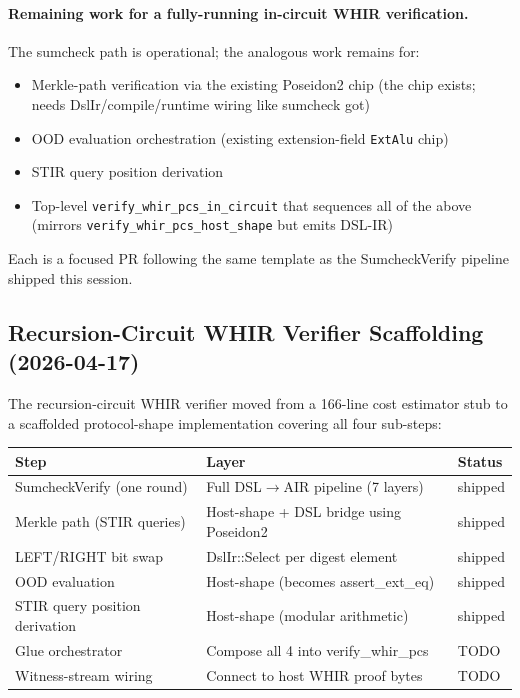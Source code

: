 \paragraph{Remaining work for a fully-running in-circuit WHIR
verification.}  The sumcheck path is operational; the analogous
work remains for:
\begin{itemize}
  \item Merkle-path verification via the existing Poseidon2 chip
        (the chip exists; needs DslIr/compile/runtime wiring like
        sumcheck got)
  \item OOD evaluation orchestration (existing extension-field
        \texttt{ExtAlu} chip)
  \item STIR query position derivation
  \item Top-level \texttt{verify\_whir\_pcs\_in\_circuit} that
        sequences all of the above (mirrors
        \texttt{verify\_whir\_pcs\_host\_shape} but emits DSL-IR)
\end{itemize}
Each is a focused PR following the same template as the
SumcheckVerify pipeline shipped this session.

\subsection{Recursion-Circuit WHIR Verifier Scaffolding (2026-04-17)}

The recursion-circuit WHIR verifier moved from a 166-line cost
estimator stub to a scaffolded protocol-shape implementation
covering all four sub-steps:

\begin{tabular}{@{}lll@{}}
\toprule
\textbf{Step}                 & \textbf{Layer}              & \textbf{Status} \\
\midrule
SumcheckVerify (one round)    & Full DSL$\to$AIR pipeline (7 layers) & shipped \\
Merkle path (STIR queries)    & Host-shape + DSL bridge using Poseidon2 & shipped \\
LEFT/RIGHT bit swap            & DslIr::Select per digest element & shipped \\
OOD evaluation                & Host-shape (becomes assert\_ext\_eq) & shipped \\
STIR query position derivation & Host-shape (modular arithmetic) & shipped \\
\midrule
Glue orchestrator             & Compose all 4 into verify\_whir\_pcs & TODO \\
Witness-stream wiring         & Connect to host WHIR proof bytes & TODO \\
\bottomrule
\end{tabular}

